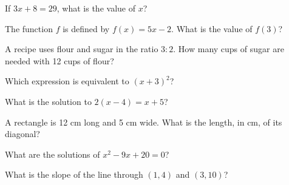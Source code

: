 \renewcommand{\nocalc}{}
\newcommand{\gr}[2]{\begin{center}\begin{tikzpicture}\begin{axis}[gridaxis,#1]#2\end{axis}\end{tikzpicture}\end{center}}
\newcommand{\pt}[1]{\node[circle,fill=apblue,inner sep=1.5pt] at (axis cs:#1){};}

\begin{exo}[Algebra]{}
If $3x+8=29$, what is the value of $x$?
\end{exo}
\begin{exo}[Algebra]{}
The function $f$ is defined by $f(x)=5x-2$. What is the value of $f(3)$?
\end{exo}
\begin{exo}{}
A recipe uses flour and sugar in the ratio $3:2$. How many cups of sugar are needed with 12 cups of flour?
\end{exo}
\begin{exo}{}
Which expression is equivalent to $(x+3)^2$?
\end{exo}
\begin{exo}[Algebra]{\sprtag}
What is the solution to $2(x-4)=x+5$?
\end{exo}
\begin{exo}{}
A rectangle is 12 cm long and 5 cm wide. What is the length, in cm, of its diagonal?
\end{exo}
\begin{exo}{}
What are the solutions of $x^2-9x+20=0$?
\end{exo}
\begin{exo}[Algebra]{}
What is the slope of the line through $(1,4)$ and $(3,10)$?
\end{exo}
